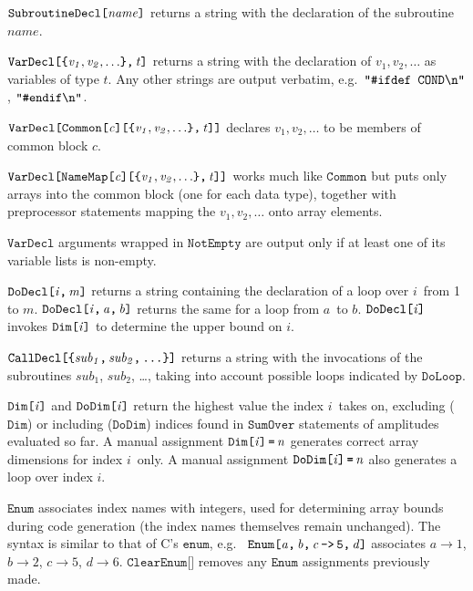 \documentclass[twoside,11pt]{article}
\def\Var#1{\ensuremath{\mathit{#1}}}
\def\Va{\Var{a}}
\def\Vb{\Var{b}}
\def\Vc{\Var{c}}
\def\Vd{\Var{d}}
\def\Vi{\Var{i}}
\def\Vm{\Var{m}}
\def\Vn{\Var{n}}
\def\Vt{\Var{t}}
\def\Code#1{\ensuremath{\texttt{#1}}}
\def\eg{e.g.\ }
\def\lbrac{\symbol{123}}
\def\rbrac{\symbol{125}}
\def\Brac#1{\lbrac#1\rbrac}
\def\backsl{\symbol{92}}
\begin{document}
\Code{SubroutineDecl[\Var{name}]} returns a string with the declaration
of the subroutine \Var{name}.

\Code{VarDecl[\Brac{\Var{v_1,v_2,\ldots}},\,\Vt]} returns a string with 
the declaration of \Var{v_1,v_2,\ldots} as variables of type \Vt.  Any 
other strings are output verbatim, \eg \Code{"\#ifdef COND\backsl n"}, 
\Code{"\#endif\backsl n"}.

\Code{VarDecl[Common[\Vc][\Brac{\Var{v_1,v_2,\ldots}},\,\Vt]]}
declares \Var{v_1,v_2,\ldots} to be members of common block \Vc.

\Code{VarDecl[NameMap[\Vc][\Brac{\Var{v_1,v_2,\ldots}},\,\Vt]]}
works much like \Code{Common} but puts only arrays into the common 
block (one for each data type), together with preprocessor statements 
mapping the \Var{v_1,v_2,\ldots} onto array elements.

\Code{VarDecl} arguments wrapped in \Code{NotEmpty} are output only if 
at least one of its variable lists is non-empty.

\Code{DoDecl[\Vi,\,\Vm]} returns a string containing the declaration of 
a loop over \Vi\ from 1 to \Vm.  \Code{DoDecl[\Vi,\,\Va,\,\Vb]} returns 
the same for a loop from \Va\ to \Vb.  \Code{DoDecl[\Vi]} invokes 
\Code{Dim[\Vi]} to determine the upper bound on \Vi.

\Code{CallDecl[\Brac{\Var{sub_1},\,\Var{sub_2},\,\dots}]} returns a 
string with the invocations of the subroutines \Var{sub_1}, \Var{sub_2}, 
\dots, taking into account possible loops indicated by 
\Code{DoLoop}.

\Code{Dim[\Vi]} and \Code{DoDim[\Vi]} return the highest value the index
\Vi\ takes on, excluding (\Code{Dim}) or including (\Code{DoDim})
indices found in \Code{SumOver} statements of amplitudes evaluated
so far.  A manual assignment \Code{Dim[\Vi]\,=\,\Vn} generates correct
array dimensions for index \Vi\ only.  A manual assignment
\Code{DoDim[\Vi]\,=\,\Vn} also generates a loop over index \Vi.

\Code{Enum} associates index names with integers, used for determining 
array bounds during code generation (the index names themselves remain 
unchanged).  The syntax is similar to that of C's \Code{enum}, \eg 
\Code{Enum[\Va,\,\Vb,\,\Vc\,->\,5,\,\Vd]} associates $\Va\to 1$,
$\Vb\to 2$, $\Vc\to 5$, $\Vd\to 6$.  \Code{ClearEnum[]} removes any 
\Code{Enum} assignments previously made.

\end{document}
